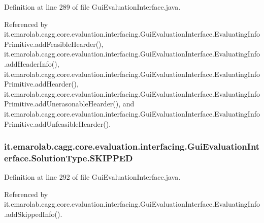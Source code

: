 Definition at line 289 of file Gui\-Evaluation\-Interface.\-java.



Referenced by it.\-emarolab.\-cagg.\-core.\-evaluation.\-interfacing.\-Gui\-Evaluation\-Interface.\-Evaluating\-Info\-Primitive.\-add\-Feasible\-Hearder(), it.\-emarolab.\-cagg.\-core.\-evaluation.\-interfacing.\-Gui\-Evaluation\-Interface.\-Evaluating\-Info.\-add\-Header\-Info(), it.\-emarolab.\-cagg.\-core.\-evaluation.\-interfacing.\-Gui\-Evaluation\-Interface.\-Evaluating\-Info\-Primitive.\-add\-Hearder(), it.\-emarolab.\-cagg.\-core.\-evaluation.\-interfacing.\-Gui\-Evaluation\-Interface.\-Evaluating\-Info\-Primitive.\-add\-Unerasonable\-Hearder(), and it.\-emarolab.\-cagg.\-core.\-evaluation.\-interfacing.\-Gui\-Evaluation\-Interface.\-Evaluating\-Info\-Primitive.\-add\-Unfeasible\-Hearder().

\hypertarget{enumit_1_1emarolab_1_1cagg_1_1core_1_1evaluation_1_1interfacing_1_1GuiEvaluationInterface_1_1SolutionType_acff2414860520601a555d38a66b39836}{
\subsubsection[{S\-K\-I\-P\-P\-E\-D}]{\setlength{\rightskip}{0pt plus 5cm}it.\-emarolab.\-cagg.\-core.\-evaluation.\-interfacing.\-Gui\-Evaluation\-Interface.\-Solution\-Type.\-S\-K\-I\-P\-P\-E\-D}}\label{enumit_1_1emarolab_1_1cagg_1_1core_1_1evaluation_1_1interfacing_1_1GuiEvaluationInterface_1_1SolutionType_acff2414860520601a555d38a66b39836}


Definition at line 292 of file Gui\-Evaluation\-Interface.\-java.



Referenced by it.\-emarolab.\-cagg.\-core.\-evaluation.\-interfacing.\-Gui\-Evaluation\-Interface.\-Evaluating\-Info.\-add\-Skipped\-Info().

